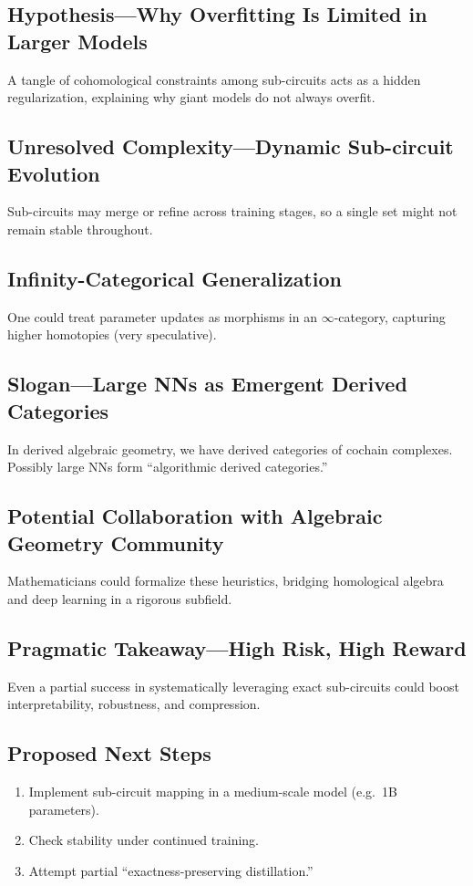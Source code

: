 \documentclass{article}
\begin{document}
\subsection{Hypothesis—Why Overfitting Is Limited in Larger Models}
A tangle of cohomological constraints among sub-circuits acts as a hidden regularization, explaining why giant models do not always overfit.

\subsection{Unresolved Complexity—Dynamic Sub-circuit Evolution}
Sub-circuits may merge or refine across training stages, so a single set might not remain stable throughout.

\subsection{Infinity-Categorical Generalization}
One could treat parameter updates as morphisms in an $\infty$-category, capturing higher homotopies (very speculative).

\subsection{Slogan—Large NNs as Emergent Derived Categories}
In derived algebraic geometry, we have derived categories of cochain complexes. Possibly large NNs form “algorithmic derived categories.”

\subsection{Potential Collaboration with Algebraic Geometry Community}
Mathematicians could formalize these heuristics, bridging homological algebra and deep learning in a rigorous subfield.

\subsection{Pragmatic Takeaway—High Risk, High Reward}
Even a partial success in systematically leveraging exact sub-circuits could boost interpretability, robustness, and compression.

\subsection{Proposed Next Steps}
\begin{enumerate}
\item Implement sub-circuit mapping in a medium-scale model (e.g.\ 1B parameters).
\item Check stability under continued training.
\item Attempt partial “exactness-preserving distillation.”
\end{enumerate}
\end{document}
